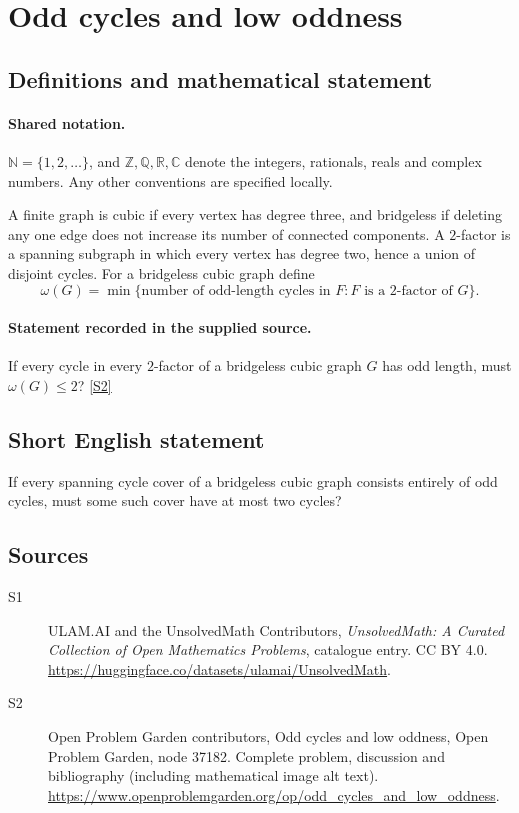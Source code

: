 \documentclass[11pt]{book}
\newcommand{\sref}[2]{\hyperlink{source:#1:#2}{[S#2]}}
\begin{document}
\section{Odd cycles and low oddness}\label{statement}

\subsection{Definitions and mathematical statement}

\paragraph{Shared notation.}$\mathbb N=\{1,2,\ldots\}$, and $\mathbb Z,\mathbb Q,\mathbb R,\mathbb C$ denote the integers, rationals, reals and complex numbers. Any other conventions are specified locally.


A finite graph is cubic if every vertex has degree three, and bridgeless if deleting any one edge does not increase its number of connected components. A $2$-factor is a spanning subgraph in which every vertex has degree two, hence a union of disjoint cycles. For a bridgeless cubic graph define
\[\omega(G)=\min\{\text{number of odd-length cycles in }F:F\text{ is a }2\text{-factor of }G\}.\]
\paragraph{Statement recorded in the supplied source.}
If every cycle in every $2$-factor of a bridgeless cubic graph $G$ has odd length, must $\omega(G)\leq2$? \sref{statement}{2}
\subsection{Short English statement}
If every spanning cycle cover of a bridgeless cubic graph consists entirely of odd cycles, must some such cover have at most two cycles?
\subsection{Sources}
\begin{description}
\item[\hypertarget{source:statement:1}{S1}] ULAM.AI and the UnsolvedMath Contributors, \emph{UnsolvedMath: A Curated Collection of Open Mathematics Problems}, catalogue entry. CC BY 4.0. \url{https://huggingface.co/datasets/ulamai/UnsolvedMath}.
\item[\hypertarget{source:statement:2}{S2}] Open Problem Garden contributors, Odd cycles and low oddness, Open Problem Garden, node 37182. Complete problem, discussion and bibliography (including mathematical image alt text). \url{https://www.openproblemgarden.org/op/odd_cycles_and_low_oddness}.
\end{description}
\label{end:statement}
\end{document}
